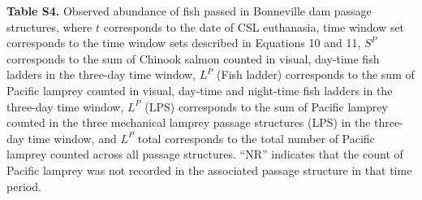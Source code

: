 \documentclass[
]{article}
\begin{document}
\newpage

\textbf{Table S4.} Observed abundance of fish passed in Bonneville dam
passage structures, where \(t\) corresponds to the date of CSL
euthanasia, time window set corresponds to the time window sets
described in Equations 10 and 11, \(S^P\) corresponds to the sum of
Chinook salmon counted in visual, day-time fish ladders in the three-day
time window, \(L^P\) (Fish ladder) corresponds to the sum of Pacific
lamprey counted in visual, day-time and night-time fish ladders in the
three-day time window, \(L^P\) (LPS) corresponds to the sum of Pacific
lamprey counted in the three mechanical lamprey passage structures (LPS)
in the three-day time window, and \(L^P\) total corresponds to the total
number of Pacific lamprey counted across all passage structures. ``NR''
indicates that the count of Pacific lamprey was not recorded in the
associated passage structure in that time period.
\end{document}
